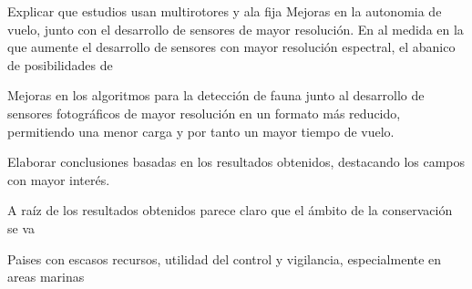 \documentclass[11pt,]{article}
\begin{document}
Explicar que estudios usan multirotores y ala fija Mejoras en la
autonomia de vuelo, junto con el desarrollo de sensores de mayor
resolución. En al medida en la que aumente el desarrollo de sensores con
mayor resolución espectral, el abanico de posibilidades de

Mejoras en los algoritmos para la detección de fauna junto al desarrollo
de sensores fotográficos de mayor resolución en un formato más reducido,
permitiendo una menor carga y por tanto un mayor tiempo de vuelo.

Elaborar conclusiones basadas en los resultados obtenidos, destacando
los campos con mayor interés.

A raíz de los resultados obtenidos parece claro que el ámbito de la
conservación se va

Paises con escasos recursos, utilidad del control y vigilancia,
especialmente en areas marinas

\newpage
\singlespacing 

\end{document}
